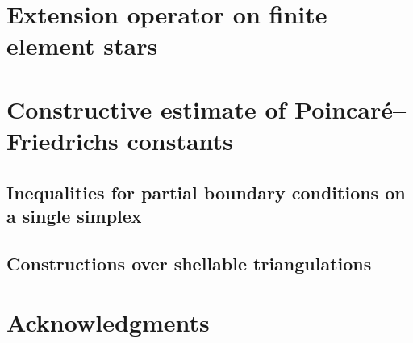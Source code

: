\documentclass[a4paper]{amsart}
\begin{document}
\section{Extension operator on finite element stars}\label{section:extension}

\section{Constructive estimate of Poincar\'e--Friedrichs constants}\label{section:poincarefriedrichs}

\subsection{Inequalities for partial boundary conditions on a single simplex}

\subsection{Constructions over shellable triangulations}



\section*{Acknowledgments}



\end{document}
